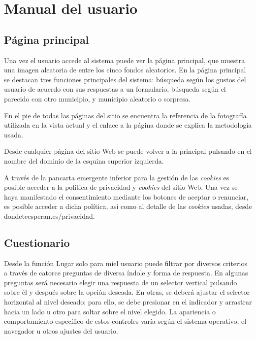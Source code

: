 \section{Manual del usuario}

\subsection{Página principal}

Una vez el usuario accede al sistema puede ver la página principal, que muestra una imagen aleatoria de entre los cinco fondos aleatorios. En la página principal se destacan tres funciones principales del sistema: búsqueda según los gustos del usuario de acuerdo con sus respuestas a un formulario, búsqueda según el parecido con otro municipio, y municipio aleatorio o sorpresa.

En el pie de todas las páginas del sitio se encuentra la referencia de la fotografía utilizada en la vista actual y el enlace a la página donde se explica la metodología usada.

Desde cualquier página del sitio Web se puede volver a la principal pulsando en el nombre del dominio de la esquina superior izquierda.

A través de la pancarta emergente inferior para la gestión de las \textit{cookies} es posible acceder a la política de privacidad y \textit{cookies} del sitio Web. Una vez se haya manifestado el consentimiento mediante los botones de aceptar o renunciar, es posible acceder a dicha política, así como al detalle de las \textit{cookies} usadas, desde dondeteesperan.es/privacidad.


\subsection{Cuestionario}

Desde la función \guillemotleft Lugar solo para mí\guillemotright\space el usuario puede filtrar por diversos criterios a través de catorce preguntas de diversa índole y forma de respuesta. En algunas preguntas será necesario elegir una respuesta de un selector vertical pulsando sobre él y después sobre la opción deseada. En otras, se deberá ajustar el selector horizontal al nivel deseado; para ello, se debe presionar en el indicador y arrastrar hacia un lado u otro para soltar sobre el nivel elegido. La apariencia o comportamiento específico de estos controles varía según el sistema operativo, el navegador u otros ajustes del usuario.

